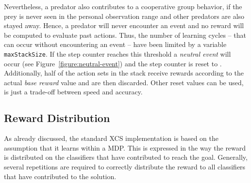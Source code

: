 Nevertheless, a predator also contributes to a cooperative group behavior, if the prey is never seen in the personal observation range and other predators are also stayed away. Hence, a predator will never encounter an event and no reward will be computed to evaluate past actions. Thus, the number of learning cycles -- that can occur without encountering an event -- have been limited by a variable \verb|maxStackSize|. If the step counter reaches this threshold a \emph{neutral event} will occur (see Figure~\ref{figure:neutral-event}) and the step counter is reset to . Additionally, half of the action sets in the stack receive rewards according to the actual \emph{base reward} value and are then discarded. Other reset values can be used,  is just a trade-off between speed and accuracy.


\subsection{Reward Distribution}
\label{subsection:reward-distribution}

As already discussed, the standard XCS implementation is based on the assumption that it learns within a MDP. This is expressed in the way the reward is distributed on the classifiers that have contributed to reach the goal. Generally, several repetitions are required to correctly distribute the reward to all classifiers that have contributed to the solution.

